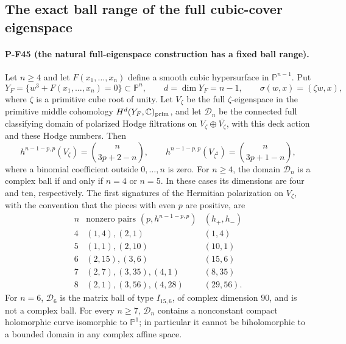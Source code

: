 \documentclass[11pt,a4paper]{article}
\begin{document}
\subsection{The exact ball range of the full cubic-cover eigenspace}
\label{sec:cyclic-cover-range}

\paragraph{P-F45 (the natural full-eigenspace construction has a fixed ball range).}
Let $n\ge4$ and let $F(x_1,\ldots,x_n)$ define a smooth cubic
hypersurface in $\mathbb P^{n-1}$. Put
\[
 Y_F=\{w^3+F(x_1,\ldots,x_n)=0\}\subset\mathbb P^n,
 \qquad d=\dim Y_F=n-1,
 \qquad \sigma(w,x)=(\zeta w,x),
\]
where $\zeta$ is a primitive cube root of unity. Let $V_\zeta$
be the full $\zeta$-eigenspace in the primitive middle cohomology
$H^d(Y_F,\mathbb C)_{\rm prim}$, and let $\mathcal D_n$ be
the connected full classifying domain of polarized Hodge
filtrations on $V_\zeta\oplus\overline{V_\zeta}$, with this
deck action and these Hodge numbers. Then
\[
 h^{n-1-p,p}(V_\zeta)=\binom n{3p+2-n},
 \qquad
 h^{n-1-p,p}(V_{\zeta^2})=\binom n{3p+1-n},
 \tag{P-F45a}
\]
where a binomial coefficient outside $0,\ldots,n$ is zero.
For $n\ge4$, the domain $\mathcal D_n$ is a complex ball
if and only if $n=4$ or $n=5$. In these cases its dimensions
are four and ten, respectively. The first signatures of the
Hermitian polarization on $V_\zeta$, with the convention
that the pieces with even $p$ are positive, are
\[
\begin{array}{c|c|c}
n&\text{nonzero pairs }(p,h^{n-1-p,p})& (h_+,h_-)\\ \hline
4&(1,4),(2,1)&(1,4)\\
5&(1,1),(2,10)&(10,1)\\
6&(2,15),(3,6)&(15,6)\\
7&(2,7),(3,35),(4,1)&(8,35)\\
8&(2,1),(3,56),(4,28)&(29,56).
\end{array}
\tag{P-F45b}
\]
For $n=6$, $\mathcal D_6$ is the matrix ball of type
$I_{15,6}$, of complex dimension $90$, and is not a complex
ball. For every $n\ge7$, $\mathcal D_n$ contains a nonconstant
compact holomorphic curve isomorphic to $\mathbb P^1$;
in particular it cannot be biholomorphic to a bounded domain
in any complex affine space.
\end{document}

